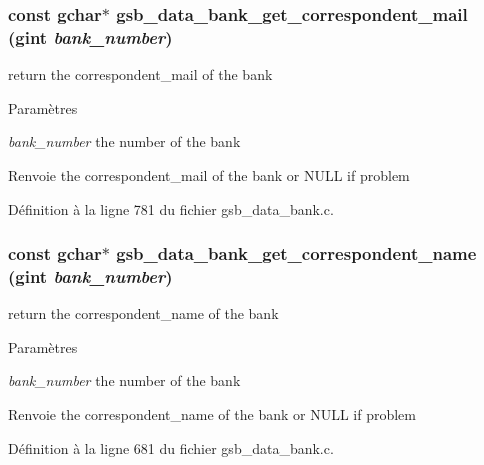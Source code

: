 \subsubsection[{gsb\_\-data\_\-bank\_\-get\_\-correspondent\_\-mail}]{\setlength{\rightskip}{0pt plus 5cm}const gchar$\ast$ gsb\_\-data\_\-bank\_\-get\_\-correspondent\_\-mail (gint {\em bank\_\-number})}\label{gsb__data__bank_8c_ab46d3251ade8383b98be516cc99a5bbe}
return the correspondent\_\-mail of the bank


\begin{DoxyParams}{Paramètres}
\item[{\em bank\_\-number}]the number of the bank\end{DoxyParams}
\begin{DoxyReturn}{Renvoie}
the correspondent\_\-mail of the bank or NULL if problem 
\end{DoxyReturn}


Définition à la ligne 781 du fichier gsb\_\-data\_\-bank.c.

\subsubsection[{gsb\_\-data\_\-bank\_\-get\_\-correspondent\_\-name}]{\setlength{\rightskip}{0pt plus 5cm}const gchar$\ast$ gsb\_\-data\_\-bank\_\-get\_\-correspondent\_\-name (gint {\em bank\_\-number})}\label{gsb__data__bank_8c_a22dc4c253cd27be2af29bf4be274aec0}
return the correspondent\_\-name of the bank


\begin{DoxyParams}{Paramètres}
\item[{\em bank\_\-number}]the number of the bank\end{DoxyParams}
\begin{DoxyReturn}{Renvoie}
the correspondent\_\-name of the bank or NULL if problem 
\end{DoxyReturn}


Définition à la ligne 681 du fichier gsb\_\-data\_\-bank.c.


